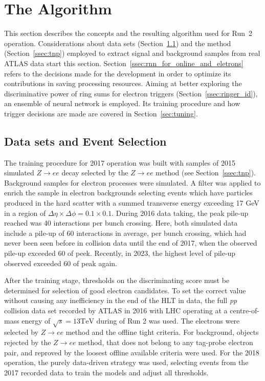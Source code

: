 \chapter{The \rnn{} Algorithm}%
\label{sec:neuralringer}

This section describes the \rnn{} concepts and the resulting algorithm used for Run~2
operation. Considerations about data sets (Section~\ref{ssec:dataset}) and the \TnP method
(Section~\ref{ssec:tnp}) employed to extract signal and background samples
from real ATLAS data start this section. Section~\ref{ssec:rnn_for_online_and_eletrons} refers to the
decisions made for the \rnn{} development in order to optimize its contributions in saving processing resources. Aiming at better exploring the discriminative
power of ring sums for electron triggers (Section~\ref{ssec:ringer_id}),
an ensemble of neural network is employed. Its training procedure and how trigger decisions are made are covered in Section~\ref{sec:tuning}.




\section{Data sets and Event Selection}%
\label{ssec:dataset}

The training procedure for 2017 operation was built with samples of 2015 simulated $Z\rightarrow ee$ decay selected by the $Z\rightarrow ee$ \TnP method (see Section~\ref{ssec:tnp}). Background samples for electron processes were simulated. A filter was applied to enrich the sample in electron backgrounds selecting events which have particles produced in the hard scatter with a summed transverse energy exceeding 17 GeV in a region of $\Delta\eta\times\Delta\phi=0.1\times0.1$. During 2016 data taking, the peak pile-up reached was 40 interactions per bunch crossing.
Here, both simulated data include a pile-up of 60 interactions in average, per bunch crossing, which had never been seen before in collision data until the end of 2017, when the observed pile-up exceeded 60 of peek. Recently, in 2023, the highest level of pile-up observed exceeded 60 of peak again.

After the training stage, thresholds on the discriminating score must be determined for selection of good electron candidates. To set the correct value without causing any inefficiency in the end of the HLT in data, the full \textit{pp} collision data set recorded by ATLAS in 2016 with LHC operating at a centre-of-mass energy of $\sqrt{s}=13 \text{TeV}$ during of Run 2 was used. The electrons were selected by $Z\rightarrow ee$ \TnP method and the offline tight criteria. For background, objects rejected by the $Z\rightarrow ee$ \TnP method, that does not belong to any tag-probe electron pair, and reproved by the loosest offline available criteria were used. For the 2018 operation, the purely data-driven strategy was used, selecting events from the 2017 recorded data to train the models and adjust all thresholds.

